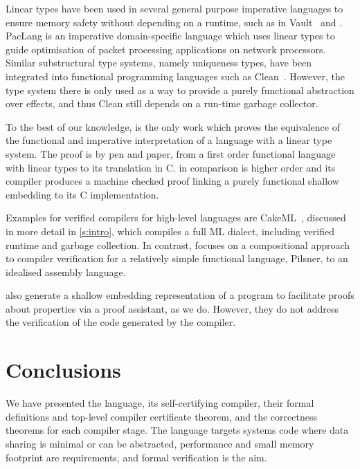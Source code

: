 \documentclass[9pt\ifFinal\else,preprint,nocopyrightspace\fi,\ifAlpha\else natbib,authoryear\fi]{sigplanconf}
\begin{document}
Linear types have been used in several general purpose imperative languages
to ensure memory safety without depending on a runtime, such as in Vault~\citep{Fahndrich_DeLine_02} and \citet{Rust:lang}.
PacLang \citep{Ennals_SM_04} is an imperative domain-specific language which uses linear
types to guide optimisation of packet processing applications on network
processors. Similar substructural type systems, namely uniqueness types, have been
integrated into functional programming languages such as
Clean~\citep{Barendsen_Smeters_93}. However, the type system there is only
used as a way to provide a purely functional abstraction over effects, 
and thus Clean still depends on a run-time garbage collector.



To the best of our knowledge, \citet{Hofmann_00} is the only work which proves the equivalence of the functional and imperative interpretation of a language with a linear type
system. The proof is by pen and paper, from a first order functional language with linear types to its translation in C. \CDSL in comparison is higher order and its compiler
produces a machine checked proof linking a purely functional shallow embedding
to its C implementation.



Examples for verified compilers for high-level languages are
CakeML~\citep{Kumar_MNO_14}, discussed in more detail in \autoref{s:intro}, which compiles a full ML dialect, including verified runtime and garbage
collection. In contrast, \citep{Neis_HKMDV_15} focuses on a compositional approach to
compiler verification for a relatively simple functional language, Pilsner,
to an idealised assembly language.

\citet{Chargueraud_10, Chargueraud_11} also generate a shallow
embedding representation of a program to facilitate proofs about
properties via a proof assistant, as we do. However, they do not address the
verification of the code generated by the compiler.

\section{Conclusions}\label{s:concl}

We have presented the \cdsl language, its self-certifying compiler, their
formal definitions and top-level compiler certificate theorem,
and the correctness theorems for each compiler stage. The
language targets systems code where data sharing is minimal or can be abstracted,
performance and small memory footprint are requirements, and formal
verification is the aim.
\end{document}
